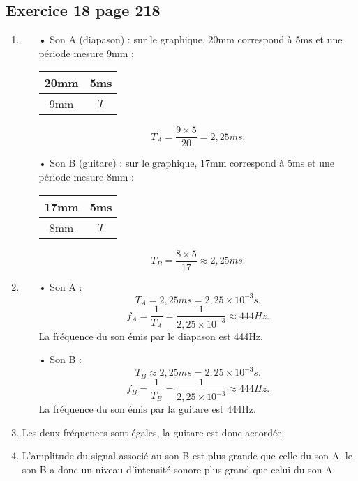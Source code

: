 \documentclass[12pt,a4paper,fleqn]{article}
\begin{document}
\subsection*{Exercice 18 page 218}

\begin{enumerate}
\item
\begin{multicols}{2}
\begin{itemize}
\item[•] Son A (diapason) : sur le graphique, \unit{20}{mm} correspond à \unit{5}{ms} et une période mesure \unit{9}{mm} :
\begin{center}
\begin{tabular}{c|c}
\unit{20}{mm} & \unit{5}{ms} \\
\hline
\unit{9}{mm} & $T$ 
\end{tabular}
\end{center}
\[
T_A = \frac{9\times 5}{20} = \unit{2{,}25}{ms}.
\]
\item[•] Son B (guitare) : sur le graphique, \unit{17}{mm} correspond à \unit{5}{ms} et une période mesure \unit{8}{mm} :
\begin{center}
\begin{tabular}{c|c}
\unit{17}{mm} & \unit{5}{ms} \\
\hline
\unit{8}{mm} & $T$ 
\end{tabular}
\end{center}
\[
T_B = \frac{8\times 5}{17} \approx \unit{2{,}25}{ms}.
\]
\end{itemize}
\end{multicols}
\item
\begin{multicols}{2}
\begin{itemize}
\item[•] Son A :
\[ T_A =  \unit{2{,}25}{ms} =  \unit{2{,}25\times10^{-3}}{s}. \]
\[  f_A = \frac{1}{T_A} = \frac{1}{2{,}25\times10^{-3}} \approx \unit{444}{Hz}. \]
La fréquence du son émis par le diapason est \unit{444}{Hz}.
\item[•] Son B :
\[ T_B \approx  \unit{2{,}25}{ms} =  \unit{2{,}25\times10^{-3}}{s}. \]
\[  f_B = \frac{1}{T_B} = \frac{1}{2{,}25\times10^{-3}} \approx \unit{444}{Hz}. \]
La fréquence du son émis par la guitare est \unit{444}{Hz}.
\end{itemize}
\end{multicols}
\item Les deux fréquences sont égales, la guitare est donc accordée.
\item L'amplitude du signal associé au son B est plus grande que celle du son A, le son B a donc un niveau d'intensité sonore plus grand que celui du son A.
\end{enumerate}
\end{document}
